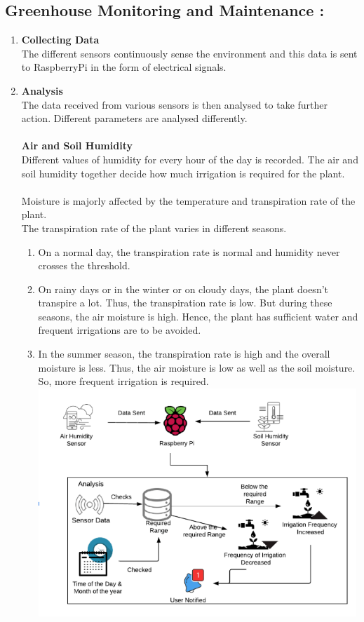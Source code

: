 \documentclass[12pt]{extarticle}
\begin{document}
\subsection{Greenhouse Monitoring and Maintenance :}
    \begin{enumerate}[label=\alph*]
        \item
            \textbf{Collecting Data}\\
            The different sensors continuously sense the environment and this data is sent to RaspberryPi in the form of electrical signals.
        \item
            \textbf{Analysis}\\
            The data received from various sensors is then analysed to take further action. Different parameters are analysed differently.\\\\
            \textbf{Air and Soil Humidity}\\
            Different values of humidity for every hour of the day is recorded. The air and soil humidity together decide how much irrigation is required for the plant.\\\\
            Moisture is majorly affected by the temperature and transpiration rate of the plant.\\
            The transpiration rate of the plant varies in different seasons.
            \begin{enumerate}[label=\arabic*]
                \item
                On  a normal day, the transpiration rate is normal and humidity never crosses the threshold.
                \item
                On rainy days or in the winter or on cloudy days, the plant doesn’t transpire a lot. Thus, the transpiration rate is low. But during these seasons, the air moisture is high. Hence, the plant has sufficient water and frequent irrigations are to be avoided.
                \item
                In the summer season, the transpiration rate is high and the overall moisture is less. Thus, the air moisture is low as well as the soil moisture. So, more frequent irrigation is required.
                \includegraphics[width=12cm]{Maintenance.png}

\end{enumerate}
\end{enumerate}
\end{document}
